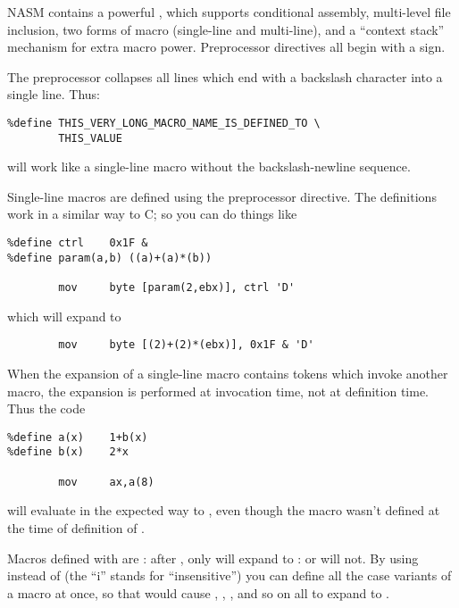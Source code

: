 %
%

NASM contains a powerful , which supports
conditional assembly, multi-level file inclusion, two forms of macro
(single-line and multi-line), and a ``context stack'' mechanism for
extra macro power. Preprocessor directives all begin with a \code{\%}
sign.

The preprocessor collapses all lines which end with a backslash
\code{\textbackslash} character into a single line.
Thus:

\begin{lstlisting}
%define THIS_VERY_LONG_MACRO_NAME_IS_DEFINED_TO \
        THIS_VALUE
\end{lstlisting}

will work like a single-line macro without the backslash-newline
sequence.



Single-line macros are defined using the  preprocessor
directive. The definitions work in a similar way to C; so you can do
things like

\begin{lstlisting}
%define ctrl    0x1F &
%define param(a,b) ((a)+(a)*(b))

        mov     byte [param(2,ebx)], ctrl 'D'
\end{lstlisting}

which will expand to

\begin{lstlisting}
        mov     byte [(2)+(2)*(ebx)], 0x1F & 'D'
\end{lstlisting}

When the expansion of a single-line macro contains tokens which
invoke another macro, the expansion is performed at invocation time,
not at definition time. Thus the code

\begin{lstlisting}
%define a(x)    1+b(x)
%define b(x)    2*x

        mov     ax,a(8)
\end{lstlisting}

will evaluate in the expected way to , even though
the macro  wasn't defined at the time of definition of .

Macros defined with  are : after
, only  will expand to :
 or  will not. By using  instead of
 (the ``i'' stands for ``insensitive'') you can define
all the case variants of a macro at once, so that 
would cause , , ,  and so on
all to expand to .

